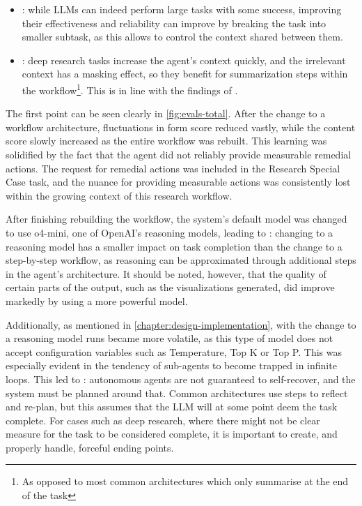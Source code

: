 \documentclass[a4paper]{report}
\begin{document}
\begin{itemize}
    \item {}\kfid : while LLMs can indeed perform large tasks with some success, improving their effectiveness and reliability can improve by breaking the task into smaller subtask, as this allows to control the context shared between them.
    \item {}\kfid : deep research tasks increase the agent's context quickly, and the irrelevant context has a masking effect, so they benefit for summarization steps within the workflow\footnote{As opposed to most common architectures which only summarise at the end of the task}. This is in line with the findings of \cite{veseli2025positionalbiasesshiftinputs}.
\end{itemize}

The first point can be seen clearly in \autoref{fig:evals-total}. After the change to a workflow architecture, fluctuations in form score reduced vastly, while the content score slowly increased as the entire workflow was rebuilt. This learning was solidified by the fact that the agent did not reliably provide measurable remedial actions. The request for remedial actions was included in the Research Special Case task, and the nuance for providing measurable actions was consistently lost within the growing context of this research workflow.

After finishing rebuilding the workflow, the system's default model was changed to use o4-mini, one of OpenAI's reasoning models, leading to \kfid : changing to a reasoning model has a smaller impact on task completion than the change to a step-by-step workflow, as reasoning can be approximated through additional steps in the agent's architecture. It should be noted, however, that the quality of certain parts of the output, such as the visualizations generated, did improve markedly by using a more powerful model.

Additionally, as mentioned in \autoref{chapter:design-implementation}, with the change to a reasoning model runs became more volatile, as this type of model does not accept configuration variables such as Temperature, Top K or Top P. This was especially evident in the tendency of sub-agents to become trapped in infinite loops. This led to \kfid : autonomous agents are not guaranteed to self-recover, and the system must be planned around that. Common architectures use steps to reflect and re-plan, but this assumes that the LLM will at some point deem the task complete. For cases such as deep research, where there might not be clear measure for the task to be considered complete, it is important to create, and properly handle, forceful ending points.
\end{document}
